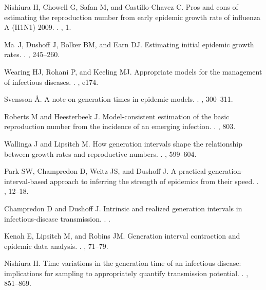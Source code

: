 \documentclass[12pt]{article}
\begin{document}
\begin{thebibliography}{10}
Nishiura H, Chowell G, Safan M, and Castillo-Chavez C.
 {Pros and cons of estimating the reproduction number from early
  epidemic growth rate of influenza A (H1N1) 2009}.
.
, 1.

Ma~J, Dushoff J, Bolker BM, and Earn DJ.
 Estimating initial epidemic growth rates.
.
, 245--260.

Wearing HJ, Rohani P, and Keeling MJ.
 Appropriate models for the management of infectious diseases.
.
, e174.

Svensson {\AA}.
 A note on generation times in epidemic models.
.
, 300--311.

Roberts M and Heesterbeek J.
 Model-consistent estimation of the basic reproduction number
  from the incidence of an emerging infection.
.
, 803.

Wallinga J and Lipsitch M.
 How generation intervals shape the relationship between growth
  rates and reproductive numbers.
.
, 599--604.

Park SW, Champredon D, Weitz JS, and Dushoff J.
 A practical generation-interval-based approach to inferring the
  strength of epidemics from their speed.
.
, 12--18.

Champredon D and Dushoff J.
 Intrinsic and realized generation intervals in
  infectious-disease transmission.
.
.

Kenah E, Lipsitch M, and Robins JM.
 Generation interval contraction and epidemic data analysis.
.
, 71--79.

Nishiura H.
 Time variations in the generation time of an infectious disease:
  implications for sampling to appropriately quantify transmission potential.
.
, 851--869.


\end{thebibliography}
\end{document}
